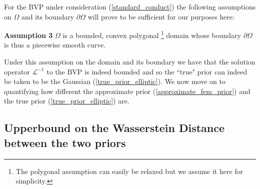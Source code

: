 For the BVP under consideration (\ref{standard_conduct}) the following assumptions on $\Omega$ and its boundary $\partial\Omega$ will prove to be sufficient for our purposes here:

\noindent \textbf{Assumption 3 } $\Omega$ is a bounded, convex polygonal \footnote{The polygonal assumption can easily be relaxed but we assume it here for simplicity.} domain whose boundary $\partial\Omega$ is thus a piecewise smooth curve.

Under this assumption on the domain and its boundary we have that the solution operator $\mathcal{L}^{-1}$ to the BVP is indeed bounded and so the ``true" prior can indeed be taken to be the Gaussian (\ref{true_prior_elliptic}). We now move on to quantifying how different the approximate prior (\ref{approximate_fem_prior}) and the true prior (\ref{true_prior_elliptic}) are.

\subsection{Upperbound on the Wasserstein Distance between the two priors}

